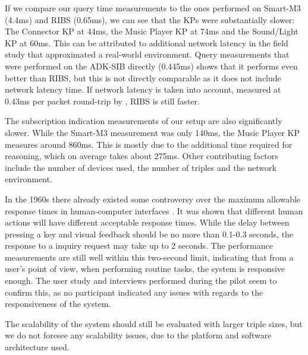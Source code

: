 
If we compare our query time measurements to the ones performed on Smart-M3 (4.4ms) and RIBS (0.65ms), we can see that the KPs were substantially slower: The Connector KP at 44ms, the Music Player KP at 74ms and the Sound/Light KP at 60ms. This can be attributed to additional network latency in the field study that approximated a real-world environment. Query measurements that were performed on the ADK-SIB directly (0.445ms) shows that it performs even better than RIBS, but this is not directly comparable as it does not include network latency time. If network latency is taken into account, measured at 0.43ms per packet round-trip by \cite{Etelapera2011}, RIBS is still faster.

The subscription indication measurements of our setup are also significantly slower. While the Smart-M3 measurement was only 140ms, the Music Player KP measures around 860ms. This is mostly due to the additional time required for reasoning, which on average takes about 275ms. Other contributing factors include the number of devices used, the number of triples and the network environment.

In the 1960s there already existed some controversy over the maximum allowable response times in human-computer interfaces \cite{Miller1968}. It was shown that different human actions will have different acceptable response times. While the delay between pressing a key and visual feedback should be no more than 0.1-0.3 seconds, the response to a inquiry request may take up to 2 seconds. The performance measurements are still well within this two-second limit, indicating that from a user's point of view, when performing routine tasks, the system is responsive enough. The user study and interviews performed during the pilot seem to confirm this, as no participant indicated any issues with regards to the responsiveness of the system.

The scalability of the system should still be evaluated with larger triple sizes, but we do not foresee any scalability issues, due to the platform and software architecture used. 

